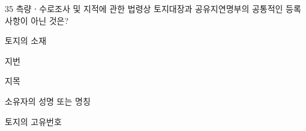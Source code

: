 \begin{question}{35}
측량ㆍ수로조사 및 지적에 관한 법령상 토지대장과 공유지연명부의 공통적인 등록사항이 아닌 것은?
\begin{choices}
  \item 토지의 소재
  \item 지번
  \item 지목
  \item 소유자의 성명 또는 명칭
  \item 토지의 고유번호
\end{choices}
\end{question}
